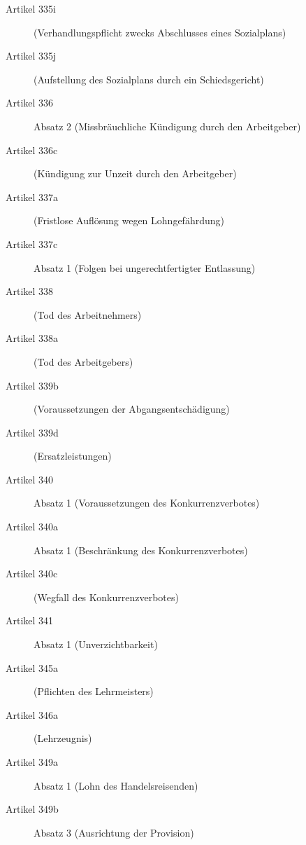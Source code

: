 \begin{description}
    \item[Artikel 335i]
    (Verhandlungspflicht zwecks Abschlusses eines Sozialplans)

    \item[Artikel 335j]
    (Aufstellung des Sozialplans durch ein Schiedsgericht)

    \item[Artikel 336]
    Absatz 2 (Missbräuchliche Kündigung durch den Arbeitgeber)

    \item[Artikel 336c]
    (Kündigung zur Unzeit durch den Arbeitgeber)

    \item[Artikel 337a]
    (Fristlose Auflösung wegen Lohngefährdung)

    \item[Artikel 337c]
    Absatz 1 (Folgen bei ungerechtfertigter Entlassung)

    \item[Artikel 338]
    (Tod des Arbeitnehmers)

    \item[Artikel 338a]
    (Tod des Arbeitgebers)

    \item[Artikel 339b]
    (Voraussetzungen der Abgangsentschädigung)

    \item[Artikel 339d]
    (Ersatzleistungen)

    \item[Artikel 340]
    Absatz 1 (Voraussetzungen des Konkurrenzverbotes)

    \item[Artikel 340a]
    Absatz 1 (Beschränkung des Konkurrenzverbotes)

    \item[Artikel 340c]
    (Wegfall des Konkurrenzverbotes)

    \item[Artikel 341]
    Absatz 1 (Unverzichtbarkeit)

    \item[Artikel 345a]
    (Pflichten des Lehrmeisters)

    \item[Artikel 346a]
    (Lehrzeugnis)

    \item[Artikel 349a]
    Absatz 1 (Lohn des Handelsreisenden)

    \item[Artikel 349b]
    Absatz 3 (Ausrichtung der Provision)


\end{description}

